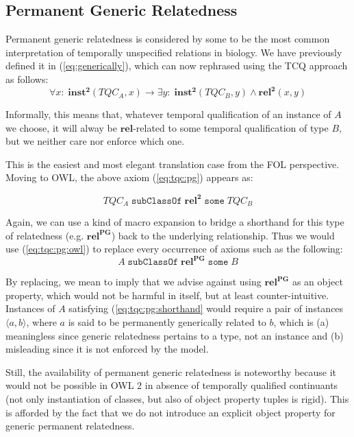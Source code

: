 \documentclass{ao2e}
\newcommand{\mirel}[1]{\ensuremath{\mathrm{\mathbf{#1}}}}
\newcommand{\mclass}[1]{\ensuremath{\mathit{#1}}}
\newcommand{\mrel}[2]{\mirel{#1^#2}}
\newcommand{\mrelb}[1]{\mrel{#1}{2}}
\newcommand{\pair}[2]{\ensuremath{\langle #1,#2\rangle}}
\newcommand{\TQC}[1]{\ensuremath{TQC_{\mclass{#1}}}}
\newcommand{\mrelpg}[1]{\mrel{#1}{{PG}}}
\begin{document}
\subsection{Permanent Generic Relatedness}
Permanent generic relatedness is considered by some to be the most common
interpretation of temporally unspecified relations in biology. We have
previously defined it in (\ref{eq:generically}), which can
now rephrased using the TCQ approach as follows:
\begin{equation}
\forall x:\; \mrelb{inst}(\TQC{A},x) \rightarrow \exists y :\;
\mrelb{inst}(\TQC{B}, y) \wedge \mrelb{rel}(x,y)
\label{eq:tqc:pg}
\end{equation}

Informally, this means that, whatever temporal qualification of an instance of
\mclass{A} we choose, it will alway be \mirel{rel}-related to some temporal
qualification of type \mclass{B}, but we neither care nor enforce which one.

This is the easiest and most elegant translation case from the FOL perspective.
Moving to OWL, the above axiom (\ref{eq:tqc:pg}) appears as: 

\begin{equation}
\TQC{A}\;\mathtt{subClassOf}\;\mrelb{rel}\;\mathtt{some}\;\TQC{B}
\label{eq:tqc:pg:owl}
\end{equation}

Again, we can use a kind of macro expansion to bridge a shorthand for this type
of relatedness (e.g. \mrelpg{rel}) back to the
underlying relationship. Thus we would use (\ref{eq:tqc:pg:owl}) to replace
every occurrence of axioms such as the following:
\begin{equation}
\mclass{A}\;\mathtt{subClassOf}\;\mrelpg{rel}\;\mathtt{some}\;\mclass{B}  
\label{eq:tqc:pg:shorthand}
\end{equation}

By replacing, we mean to imply that we advise against using \mrelpg{rel} as an
object property, which would not be harmful in itself, but at least
counter-intuitive. Instances of \mclass{A} satisfying
(\ref{eq:tqc:pg:shorthand} would require a pair of instances \pair{a}{b}, where
$a$ is said to be permanently generically related to $b$, which is (a)
meaningless since generic relatedness pertains to a type, not an instance and
(b) misleading since it is not enforced by the model.

Still, the availability of permanent generic relatedness is noteworthy because
it would not be possible in OWL 2 in absence of temporally qualified
continuants (not only instantiation of classes, but also of object property
tuples is rigid). This is afforded by the fact that we do not introduce an
explicit object property for generic permanent relatedness. 
\end{document}

